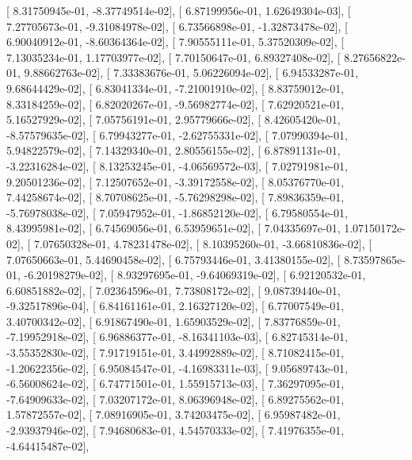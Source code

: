 \documentclass{article}
\begin{document}
       [  8.31750945e-01,  -8.37749514e-02],
       [  6.87199956e-01,   1.62649304e-03],
       [  7.27705673e-01,  -9.31084978e-02],
       [  6.73566898e-01,  -1.32873478e-02],
       [  6.90040912e-01,  -8.60364364e-02],
       [  7.90555111e-01,   5.37520309e-02],
       [  7.13035234e-01,   1.17703977e-02],
       [  7.70150647e-01,   6.89327408e-02],
       [  8.27656822e-01,   9.88662763e-02],
       [  7.33383676e-01,   5.06226094e-02],
       [  6.94533287e-01,   9.68644429e-02],
       [  6.83041334e-01,  -7.21001910e-02],
       [  8.83759012e-01,   8.33184259e-02],
       [  6.82020267e-01,  -9.56982774e-02],
       [  7.62920521e-01,   5.16527929e-02],
       [  7.05756191e-01,   2.95779666e-02],
       [  8.42605420e-01,  -8.57579635e-02],
       [  6.79943277e-01,  -2.62755331e-02],
       [  7.07990394e-01,   5.94822579e-02],
       [  7.14329340e-01,   2.80556155e-02],
       [  6.87891131e-01,  -3.22316284e-02],
       [  8.13253245e-01,  -4.06569572e-03],
       [  7.02791981e-01,   9.20501236e-02],
       [  7.12507652e-01,  -3.39172558e-02],
       [  8.05376770e-01,   7.44258674e-02],
       [  8.70708625e-01,  -5.76298298e-02],
       [  7.89836359e-01,  -5.76978038e-02],
       [  7.05947952e-01,  -1.86852120e-02],
       [  6.79580554e-01,   8.43995981e-02],
       [  6.74569056e-01,   6.53959651e-02],
       [  7.04335697e-01,   1.07150172e-02],
       [  7.07650328e-01,   4.78231478e-02],
       [  8.10395260e-01,  -3.66810836e-02],
       [  7.07650663e-01,   5.44690458e-02],
       [  6.75793446e-01,   3.41380155e-02],
       [  8.73597865e-01,  -6.20198279e-02],
       [  8.93297695e-01,  -9.64069319e-02],
       [  6.92120532e-01,   6.60851882e-02],
       [  7.02364596e-01,   7.73808172e-02],
       [  9.08739440e-01,  -9.32517896e-04],
       [  6.84161161e-01,   2.16327120e-02],
       [  6.77007549e-01,   3.40700342e-02],
       [  6.91867490e-01,   1.65903529e-02],
       [  7.83776859e-01,  -7.19952918e-02],
       [  6.96886377e-01,  -8.16341103e-03],
       [  6.82745314e-01,  -3.55352830e-02],
       [  7.91719151e-01,   3.44992889e-02],
       [  8.71082415e-01,  -1.20622356e-02],
       [  6.95084547e-01,  -4.16983311e-03],
       [  9.05689743e-01,  -6.56008624e-02],
       [  6.74771501e-01,   1.55915713e-03],
       [  7.36297095e-01,  -7.64909633e-02],
       [  7.03207172e-01,   8.06396948e-02],
       [  6.89275562e-01,   1.57872557e-02],
       [  7.08916905e-01,   3.74203475e-02],
       [  6.95987482e-01,  -2.93937946e-02],
       [  7.94680683e-01,   4.54570333e-02],
       [  7.41976355e-01,  -4.64415487e-02],
\end{document}
